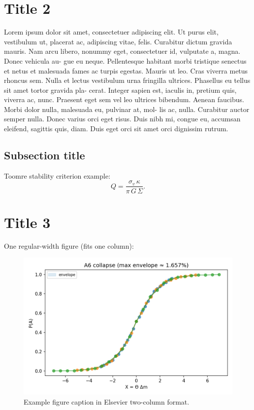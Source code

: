 \documentclass[final,5p,times,authoryear]{elsarticle}
\begin{document}
\section{Title 2}
Lorem ipsum dolor sit amet, consectetuer adipiscing elit. Ut
purus elit, vestibulum ut, placerat ac, adipiscing vitae, felis.
Curabitur dictum gravida mauris. Nam arcu libero, nonummy
eget, consectetuer id, vulputate a, magna. Donec vehicula au-
gue eu neque. Pellentesque habitant morbi tristique senectus et
netus et malesuada fames ac turpis egestas. Mauris ut leo. Cras
viverra metus rhoncus sem. Nulla et lectus vestibulum urna
fringilla ultrices. Phasellus eu tellus sit amet tortor gravida pla-
cerat. Integer sapien est, iaculis in, pretium quis, viverra ac,
nunc. Praesent eget sem vel leo ultrices bibendum. Aenean
faucibus. Morbi dolor nulla, malesuada eu, pulvinar at, mol-
lis ac, nulla. Curabitur auctor semper nulla. Donec varius orci
eget risus. Duis nibh mi, congue eu, accumsan eleifend, sagittis
quis, diam. Duis eget orci sit amet orci dignissim rutrum.

\subsection{Subsection title}
Toomre stability criterion example:
\begin{equation}
  Q=\frac{\sigma_v\,\kappa}{\pi\,G\,\Sigma}.
\end{equation}

\section{Title 3}
One regular-width figure (fits one column):

\begin{figure}[!t]
  \centering
  \includegraphics[width=\linewidth]{fig_1} %
  \caption{Example figure caption in Elsevier two-column format.}
  \label{fig:plbcover}
\end{figure}
\end{document}
